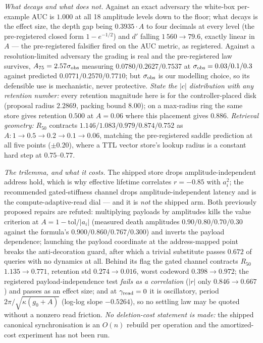 \emph{What decays and what does not.} Against an exact adversary the white-box per-example AUC is $1.000$ at all 18 amplitude levels down to the floor; what decays is the effect size, the depth gap being $0.3935\cdot A$ to four decimals at every level (the pre-registered closed form $1-e^{-1/2}$) and $d'$ falling $1\,560\to79.6$, exactly linear in $A$ --- the pre-registered falsifier fired on the AUC metric, as registered. Against a resolution-limited adversary the grading is real and the pre-registered law survives, $A_{75}=2.57\sigma_{\rm obs}$ measuring $0.0780/0.2627/0.7537$ at $\sigma_{\rm obs}=0.03/0.1/0.3$ against predicted $0.0771/0.2570/0.7710$; but $\sigma_{\rm obs}$ is our modelling choice, so its defensible use is mechanistic, never protective. \emph{State the $|c|$ distribution with any retention number:} every retention magnitude here is for the controller-placed disk (proposal radius $2.2869$, packing bound $8.00$); on a max-radius ring the same store gives retention $0.500$ at $A=0.06$ where this placement gives $0.886$. \emph{Retrieval geometry:} $R_{50}$ contracts $1.146/1.083/0.979/0.874/0.752$ as $A:1\to0.5\to0.2\to0.1\to0.06$, matching the pre-registered saddle prediction at all five points ($\pm0.20$), where a TTL vector store's lookup radius is a constant hard step at $0.75$--$0.77$.

\emph{The trilemma, and what it costs.} The shipped store drops amplitude-independent address hold, which is why effective lifetime correlates $r=-0.85$ with $a_i^2$; the recommended gated-stiffness channel drops amplitude-independent latency and is the compute-adaptive-read dial --- and it is \emph{not} the shipped arm. Both previously proposed repairs are refuted: multiplying payloads by amplitudes kills the value criterion at $A=1-\text{tol}/|a_i|$ (measured death amplitudes $0.90/0.80/0.70/0.30$ against the formula's $0.900/0.860/0.767/0.300$) and inverts the payload dependence; launching the payload coordinate at the address-mapped point breaks the anti-decoration guard, after which a trivial substitute passes $0.672$ of queries with no dynamics at all. Behind its flag the gated channel contracts $R_{50}$ $1.135\to0.771$, retention std $0.274\to0.016$, worst codeword $0.398\to0.972$; the registered payload-independence test \emph{fails as a correlation} ($|r|$ only $0.846\to0.667$) and passes as an effect size; and at $\gamma_{\rm read}=0$ it is oscillatory, period $2\pi/\sqrt{\kappa(g_0+A)}$ (log-log slope $-0.5264$), so no settling law may be quoted without a nonzero read friction. \emph{No deletion-cost statement is made:} the shipped canonical synchronisation is an $O(n)$ rebuild per operation and the amortized-cost experiment has not been run.

